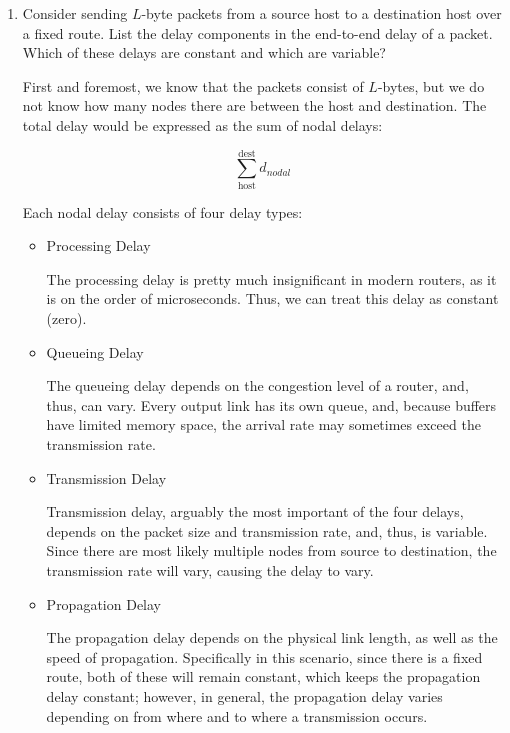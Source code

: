 \begin{enumerate}

  \item Consider sending $L$-byte packets from a source host to a destination host over a fixed route. List the delay components in the end-to-end delay of a packet. Which of these delays are constant and which are variable?

    First and foremost, we know that the packets consist of $L$-bytes, but we do not know how many nodes there are between the host and destination. The total delay would be expressed as the sum of nodal delays:

    $$\sum_{\text{host}}^{\text{dest}}d_{nodal}$$

    Each nodal delay consists of four delay types:

    \begin{itemize}

      \item Processing Delay

        The processing delay is pretty much insignificant in modern routers, as it is on the order of microseconds. Thus, we can treat this delay as constant (zero).

      \item Queueing Delay

        The queueing delay depends on the congestion level of a router, and, thus, can vary. Every output link has its own queue, and, because buffers have limited memory space, the arrival rate may sometimes exceed the transmission rate.

      \item Transmission Delay

        Transmission delay, arguably the most important of the four delays, depends on the packet size and transmission rate, and, thus, is variable. Since there are most likely multiple nodes from source to destination, the transmission rate will vary, causing the delay to vary.

      \item Propagation Delay

        The propagation delay depends on the physical link length, as well as the speed of propagation. Specifically in this scenario, since there is a fixed route, both of these will remain constant, which keeps the propagation delay constant; however, in general, the propagation delay varies depending on from where and to where a transmission occurs.

    \end{itemize}
    

\end{enumerate}
